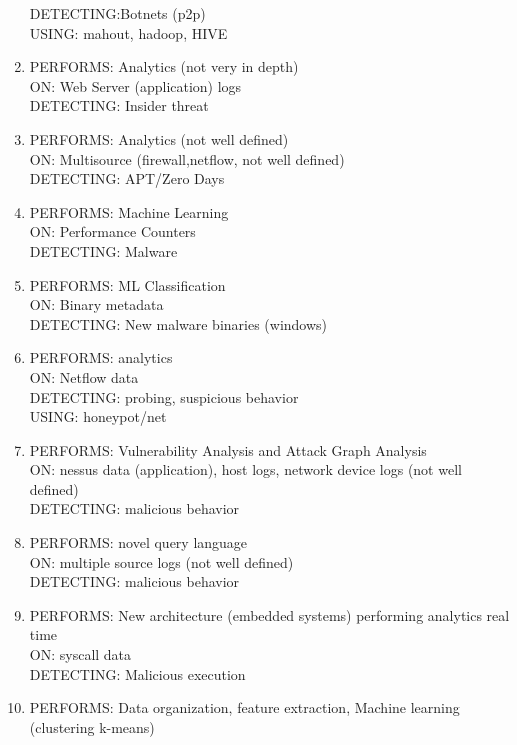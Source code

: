 \documentclass[conference]{IEEEtran}
\begin{document}
\begin{enumerate}
    DETECTING:Botnets (p2p)\\ 
    USING: mahout, hadoop, HIVE 
    \cite{singh2014big}
    \item 
    PERFORMS: Analytics (not very in depth)\\ 
    ON: Web Server (application) logs\\ 
    DETECTING: Insider threat 
    \cite{myers2009towards}
    \item 
    PERFORMS: Analytics (not well defined)\\ 
    ON: Multisource (firewall,netflow, not well defined)\\ DETECTING: APT/Zero Days \cite{ahn2014big} 
    \item 
    PERFORMS: Machine Learning\\ 
    ON: Performance Counters\\ 
    DETECTING: Malware 
    \cite{demme2013feasibility}
    \item 
    PERFORMS: ML Classification\\ 
    ON: Binary metadata\\ 
    DETECTING: New malware binaries (windows) \cite{schultz2001data}
    \item 
    PERFORMS: analytics\\ 
    ON: Netflow data\\ 
    DETECTING: probing, suspicious behavior\\ 
    USING: honeypot/net \cite{hieb2004anomaly}
    \item 
    PERFORMS: Vulnerability Analysis and Attack Graph Analysis\\ 
    ON: nessus data (application), host logs, network device logs (not well defined)\\ 
    DETECTING: malicious behavior \cite{jajodia2009topological}
    \item 
    PERFORMS: novel query language\\ 
    ON: multiple source logs (not well defined)\\ 
    DETECTING: malicious behavior \cite{gao2018saql}
    \item 
    PERFORMS: New architecture (embedded systems) performing analytics real time\\ 
    ON: syscall data\\ 
    DETECTING: Malicious execution \cite{rahmatian2012hardware}
    \item 
    PERFORMS: Data organization, feature extraction, Machine learning (clustering k-means)\\ 

\end{enumerate}
\end{document}
